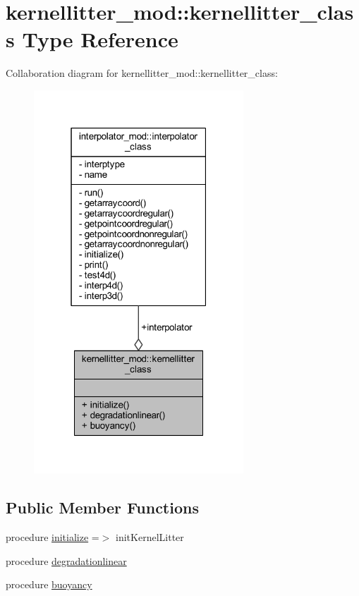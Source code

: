 \hypertarget{structkernellitter__mod_1_1kernellitter__class}{}\section{kernellitter\+\_\+mod\+:\+:kernellitter\+\_\+class Type Reference}
\label{structkernellitter__mod_1_1kernellitter__class}


Collaboration diagram for kernellitter\+\_\+mod\+:\+:kernellitter\+\_\+class\+:\nopagebreak
\begin{figure}[H]
\begin{center}
\leavevmode
\includegraphics[width=223pt]{structkernellitter__mod_1_1kernellitter__class__coll__graph}
\end{center}
\end{figure}
\subsection*{Public Member Functions}
\begin{DoxyCompactItemize}
\item 
procedure \mbox{\hyperlink{structkernellitter__mod_1_1kernellitter__class_a68ea60cecab08969da13adceb6762bc6}{initialize}} =$>$ init\+Kernel\+Litter
\item 
procedure \mbox{\hyperlink{structkernellitter__mod_1_1kernellitter__class_ac0baa73b7ea63898095e6345271bccc4}{degradationlinear}}
\item 
procedure \mbox{\hyperlink{structkernellitter__mod_1_1kernellitter__class_ae273210976c4a16ec9e76dff0a1ef034}{buoyancy}}
\end{DoxyCompactItemize}
